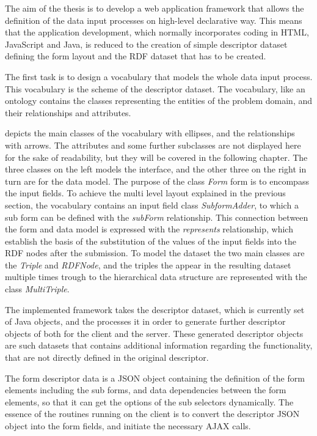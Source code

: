 The aim of the thesis is to develop a web application framework that allows the definition of the data input processes on high-level declarative way. This means that the application development, which normally incorporates coding in HTML, JavaScript and Java, is reduced to the creation of simple descriptor dataset defining the form layout and the RDF dataset that has to be created.

The first task is to design a vocabulary that models the whole data input process. This vocabulary is the scheme of the descriptor dataset. The vocabulary, like an ontology contains the classes representing the entities of the problem domain, and their relationships and attributes.


 depicts the main classes of the vocabulary with ellipses, and the relationships with arrows. The attributes and some further subclasses are not displayed here for the sake of readability, but they will be covered in the following chapter. The three classes on the left models the interface, and the other three on the right in turn are for the data model. The purpose of the class \textit{Form} form is to encompass the input fields. To achieve the multi level layout explained in the previous section, the vocabulary contains an input field class \textit{SubformAdder}, to which a sub form can be defined with the \textit{subForm} relationship. This connection between the form and data model is expressed with the \textit{represents} relationship, which establish the basis of the substitution of the values of the input fields into the RDF nodes after the submission. To model the dataset the two main classes are the \textit{Triple} and \textit{RDFNode}, and the triples the appear in the resulting dataset multiple times trough to the hierarchical data structure are represented with the class \textit{MultiTriple}. 

The implemented framework takes the descriptor dataset, which is currently set of Java objects, and the processes it in order to generate further descriptor objects of both for the client and the server. These generated descriptor objects are such datasets that contains additional information regarding the functionality, that are not directly defined in the original descriptor. 


The form descriptor data is a JSON object containing the definition of the form elements including the sub forms, and data dependencies between the form elements, so that it can get the options of the sub selectors dynamically. The essence of the routines running on the client is to convert the descriptor JSON object into the form fields, and initiate the necessary AJAX calls.

